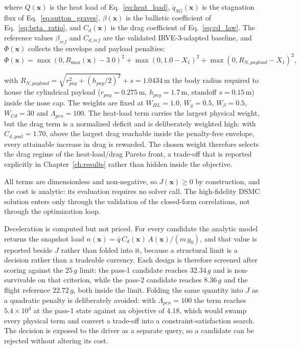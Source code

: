 \noindent where $Q(\mathbf{x})$ is the heat load of Eq.~\eqref{eq:heat_load}, $\dot{q}_{SG}(\mathbf{x})$ is the stagnation flux of Eq.~\eqref{eq:sutton_graves}, $\beta(\mathbf{x})$ is the ballistic coefficient of Eq.~\eqref{eq:beta_ratio}, and $C_d(\mathbf{x})$ is the drag coefficient of Eq.~\eqref{eq:cd_law}. The reference values $\beta_{ref}$ and $C_{d,ref}$ are the validated IRVE-3-adapted baseline, and $\Phi(\mathbf{x})$ collects the envelope and payload penalties:
\begin{equation}
    \Phi(\mathbf{x}) = \max(0, R_{\max}(\mathbf{x}) - 3.0)^{2} + \max(0, 1.0 - X_1)^{2} + \max(0, R_{N,payload} - X_1)^{2},
    \label{eq:penalty}
\end{equation}

\noindent with $R_{N,payload}=\sqrt{r_{pay}^2+(h_{pay}/2)^2}+s = 1.0434$\,m the body radius required to house the cylindrical payload ($r_{pay}=0.275$\,m, $h_{pay}=1.7$\,m, standoff $s=0.15$\,m) inside the nose cap. The weights are fixed at $W_{HL} = 1.0$, $W_{q} = 0.5$, $W_{\beta} = 0.5$, $W_{Cd} = 30$ and $\Lambda_{pen} = 100$. The heat-load term carries the largest physical weight, but the drag term is a normalized deficit and is deliberately weighted high: with $C_{d,goal} = 1.70$, above the largest drag reachable inside the penalty-free envelope, every attainable increase in drag is rewarded. The chosen weight therefore selects the drag regime of the heat-load/drag Pareto front, a trade-off that is reported explicitly in Chapter~\ref{ch:results} rather than hidden inside the objective.

All terms are dimensionless and non-negative, so $J(\mathbf{x}) \ge 0$ by construction, and the cost is analytic: its evaluation requires no solver call. The high-fidelity DSMC solution enters only through the validation of the closed-form correlations, not through the optimization loop.

\noindent Deceleration is computed but not priced. For every candidate the analytic model returns the snapshot load $n(\mathbf{x}) = \bar{q}\,C_d(\mathbf{x})\,A(\mathbf{x})/(m\,g_0)$, and that value is reported beside $J$ rather than folded into it, because a structural limit is a decision rather than a tradeable currency. Each design is therefore screened after scoring against the $25\,g$ limit: the pass-1 candidate reaches $32.34\,g$ and is non-survivable on that criterion, while the pass-2 candidate reaches $8.36\,g$ and the flight reference $22.72\,g$, both inside the limit. Folding the same quantity into $J$ as a quadratic penalty is deliberately avoided: with $\Lambda_{pen}=100$ the term reaches $5.4\times10^{3}$ at the pass-1 state against an objective of $4.18$, which would swamp every physical term and convert a trade-off into a constraint-satisfaction search. The decision is exposed to the driver as a separate query, so a candidate can be rejected without altering its cost.

